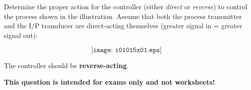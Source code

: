 

Determine the proper action for the controller (either {\it direct} or {\it reverse}) to control the process shown in the illustration.  Assume that both the process transmitter and the I/P transducer are direct-acting themselves (greater signal in = greater signal out):

$$\texttt{[image: i01015x01.eps]}$$







The controller should be {\bf reverse-acting}.







{\bf This question is intended for exams only and not worksheets!}.



